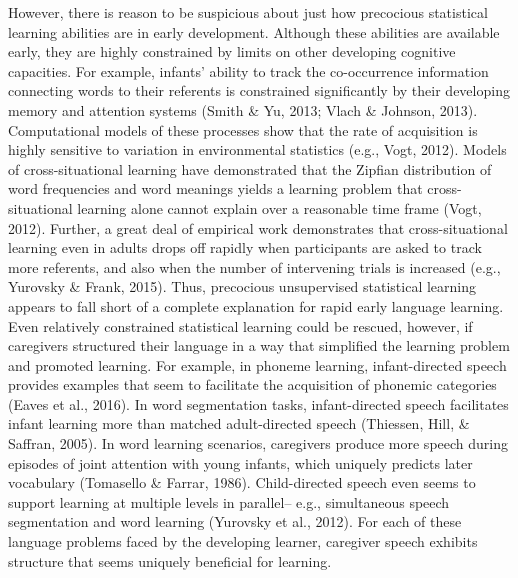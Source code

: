\documentclass[english,,man,floatsintext]{apa6}
\begin{document}
However, there is reason to be suspicious about just how precocious statistical learning abilities are in early development. Although these abilities are available early, they are highly constrained by limits on other developing cognitive capacities. For example, infants' ability to track the co-occurrence information connecting words to their referents is constrained significantly by their developing memory and attention systems (Smith \& Yu, 2013; Vlach \& Johnson, 2013). Computational models of these processes show that the rate of acquisition is highly sensitive to variation in environmental statistics (e.g., Vogt, 2012). Models of cross-situational learning have demonstrated that the Zipfian distribution of word frequencies and word meanings yields a learning problem that cross-situational learning alone cannot explain over a reasonable time frame (Vogt, 2012). Further, a great deal of empirical work demonstrates that cross-situational learning even in adults drops off rapidly when participants are asked to track more referents, and also when the number of intervening trials is increased (e.g., Yurovsky \& Frank, 2015). Thus, precocious unsupervised statistical learning appears to fall short of a complete explanation for rapid early language learning.
Even relatively constrained statistical learning could be rescued, however, if caregivers structured their language in a way that simplified the learning problem and promoted learning. For example, in phoneme learning, infant-directed speech provides examples that seem to facilitate the acquisition of phonemic categories (Eaves et al., 2016). In word segmentation tasks, infant-directed speech facilitates infant learning more than matched adult-directed speech (Thiessen, Hill, \& Saffran, 2005). In word learning scenarios, caregivers produce more speech during episodes of joint attention with young infants, which uniquely predicts later vocabulary (Tomasello \& Farrar, 1986). Child-directed speech even seems to support learning at multiple levels in parallel-- e.g., simultaneous speech segmentation and word learning (Yurovsky et al., 2012). For each of these language problems faced by the developing learner, caregiver speech exhibits structure that seems uniquely beneficial for learning.
\end{document}
